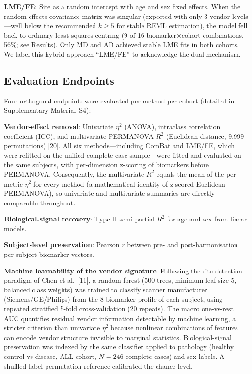 \documentclass[12pt,a4paper]{article}
\begin{document}
\textbf{LME/FE}: Site as a random intercept with age and sex fixed effects. When the random-effects covariance matrix was singular (expected with only 3 vendor levels---well below the recommended $k\geq5$ for stable REML estimation), the model fell back to ordinary least squares centring (9 of 16 biomarker$\times$cohort combinations, 56\%; see Results). Only MD and AD achieved stable LME fits in both cohorts. We label this hybrid approach ``LME/FE'' to acknowledge the dual mechanism.

\subsection{Evaluation Endpoints}

Four orthogonal endpoints were evaluated per method per cohort (detailed in Supplementary Material~S4):

\textbf{Vendor-effect removal}: Univariate $\eta^2$ (ANOVA), intraclass correlation coefficient (ICC), and multivariate PERMANOVA $R^2$ (Euclidean distance, 9,999 permutations) [20]. All six methods---including ComBat and LME/FE, which were refitted on the unified complete-case sample---were fitted and evaluated on the same subjects, with per-dimension z-scoring of biomarkers before PERMANOVA. Consequently, the multivariate $R^2$ equals the mean of the per-metric $\eta^2$ for every method (a mathematical identity of z-scored Euclidean PERMANOVA), so univariate and multivariate summaries are directly comparable throughout.

\textbf{Biological-signal recovery}: Type-II semi-partial $R^2$ for age and sex from linear models.

\textbf{Subject-level preservation}: Pearson $r$ between pre- and post-harmonisation per-subject biomarker vectors.

\textbf{Machine-learnability of the vendor signature}: Following the site-detection paradigm of Chen et al.\ [11], a random forest (500 trees, minimum leaf size 5, balanced class weights) was trained to classify scanner manufacturer (Siemens/GE/Philips) from the 8-biomarker profile of each subject, using repeated stratified 5-fold cross-validation (20 repeats). The macro one-vs-rest AUC quantifies residual vendor information detectable by machine learning, a stricter criterion than univariate $\eta^2$ because nonlinear combinations of features can encode vendor structure invisible to marginal statistics. Biological-signal preservation was indexed by the same classifier applied to pathology (healthy control vs disease, ALL cohort, $N=246$ complete cases) and sex labels. A shuffled-label permutation reference calibrated the chance level.
\end{document}
